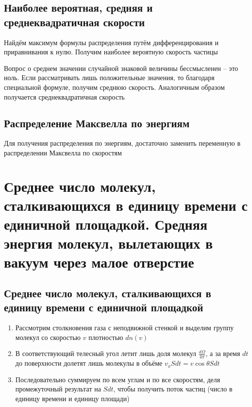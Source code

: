 \documentclass[a4paper, 14pt]{article}
\begin{document}
    \subsection{Наиболее вероятная, средняя и среднеквадратичная скорости}
    
    Найдём максимум формулы распределения путём дифференцирования и приравнивания к нулю.
    Получим наиболее вероятную скорость частицы
    
    Вопрос о среднем значении случайной знаковой величины бессмысленен -- это ноль.
    Если рассматривать лишь положительные значения, то благодаря специальной формуле, получим среднюю скорость.
    Аналогичным образом получается среднеквадратичная скорость
    
    \subsection{Распределение Максвелла по энергиям}
    
    Для получения распределения по энергиям, достаточно заменить переменную в распределении Максвелла по скоростям
    
    \section{Среднее число молекул, сталкивающихся в единицу времени с единичной площадкой.
    Средняя энергия молекул, вылетающих в вакуум через малое отверстие}
    
    \subsection{Среднее число молекул, сталкивающихся в единицу времени с единичной площадкой}
    
    \begin{enumerate}
        \item Рассмотрим столкновения газа с неподвижной стенкой и выделим группу молекул со скоростью $v$ плотностью
        $dn(v)$
        \item В соответствующий телесный угол летит лишь доля молекул $\frac{d\Omega}{4\pi}$, а за время $dt$ до
        поверхности долетят лишь молекулы в объёме $v_x Sdt = v \cos \theta Sdt$
        \item Последовательно суммируем по всем углам и по все скоростям, деля промежуточный результат на $Sdt$,
        чтобы получить поток частиц (число в единицу времени и единицу площади)
    \end{enumerate}
    
\end{document}
